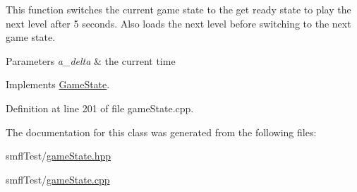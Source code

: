 This function switches the current game state to the get ready state to play the next level after 5 seconds. Also loads the next level before switching to the next game state.


\begin{DoxyParams}{Parameters}
{\em a\+\_\+delta} & the current time \\
\hline
\end{DoxyParams}


Implements \hyperlink{class_game_state_ab1fe4312f7ce88e7dc11f9935dee67d1}{Game\+State}.



Definition at line 201 of file game\+State.\+cpp.



The documentation for this class was generated from the following files\+:\begin{DoxyCompactItemize}
\item 
smfl\+Test/\hyperlink{game_state_8hpp}{game\+State.\+hpp}\item 
smfl\+Test/\hyperlink{game_state_8cpp}{game\+State.\+cpp}\end{DoxyCompactItemize}
